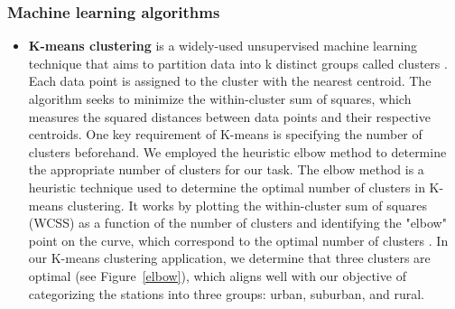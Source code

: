 \documentclass[gmd, manuscript]{copernicus}
\begin{document}
\subsubsection{Machine learning algorithms}
\begin{itemize}
    \item \textbf{K-means clustering} is a widely-used unsupervised machine learning technique that aims to partition data into k distinct groups called clusters \cite{bahmani2012scalable, sinaga2020unsupervised, pelleg2000x}. Each data point is assigned to the cluster with the nearest centroid. The algorithm seeks to minimize the within-cluster sum of squares, which measures the squared distances between data points and their respective centroids. %
    One key requirement of K-means is specifying the number of clusters beforehand. We employed the heuristic elbow method to determine the appropriate number of clusters for our task. The elbow method is a heuristic technique used to determine the optimal number of clusters in K-means clustering. It works by plotting the within-cluster sum of squares (WCSS) as a function of the number of clusters and identifying the "elbow" point on the curve, which correspond to the optimal number of clusters \citep{ketchen1996application}.
    In our K-means clustering application, we determine that three clusters are optimal (see Figure~\ref{elbow}), which aligns well with our objective of categorizing the stations into three groups: urban, suburban, and rural. 

\end{itemize}
\end{document}
